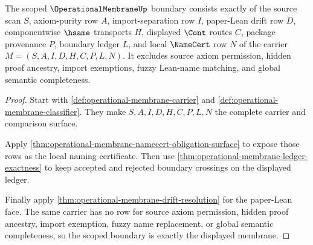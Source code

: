 \begin{theorem}
\label{thm:operational-membrane-scoped-boundary}
The scoped $\OperationalMembraneUp$ boundary consists exactly of the source scan $S$, axiom-purity row $A$, import-separation row $I$, paper-Lean drift row $D$, componentwise $\hsame$ transports $H$, displayed $\Cont$ routes $C$, package provenance $P$, boundary ledger $L$, and local $\NameCert$ row $N$ of the carrier $M=(S,A,I,D,H,C,P,L,N)$. It excludes source axiom permission, hidden proof ancestry, import exemptions, fuzzy Lean-name matching, and global semantic completeness.
\end{theorem}
\begin{proof}
Start with \autoref{def:operational-membrane-carrier} and \autoref{def:operational-membrane-classifier}. They make $S,A,I,D,H,C,P,L,N$ the complete carrier and comparison surface.

Apply \autoref{thm:operational-membrane-namecert-obligation-surface} to expose those rows as the local naming certificate. Then use \autoref{thm:operational-membrane-ledger-exactness} to keep accepted and rejected boundary crossings on the displayed ledger.

Finally apply \autoref{thm:operational-membrane-drift-resolution} for the paper-Lean face. The same carrier has no row for source axiom permission, hidden proof ancestry, import exemption, fuzzy name replacement, or global semantic completeness, so the scoped boundary is exactly the displayed membrane.
\end{proof}

